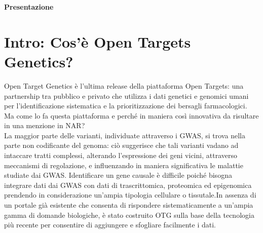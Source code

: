 \documentclass{article}
\begin{document}
\begin{center}
    \vspace*{1cm}
    \LARGE
    \textbf{Presentazione}

\end{center}
\Large
\section*{Intro: Cos'è Open Targets Genetics?}
Open Target Genetics è {l’ultima release della piattaforma Open Targets}: una partnership tra pubblico e privato
che utilizza i dati genetici e genomici umani per l’identificazione sistematica e la prioritizzazione dei bersagli
farmacologici.\\
Ma come lo fa questa piattaforma e perché in maniera così innovativa da risultare in una menzione in NAR?\\
La maggior parte delle varianti, individuate attraverso i GWAS, si trova nella parte non codificante del
genoma: ciò suggerisce che tali varianti vadano ad intaccare tratti complessi, alterando l’espressione
dei geni vicini, attraverso meccanismi di regolazione, e influenzando in maniera significativa le malattie
studiate dai GWAS. Identificare un gene causale è difficile poiché bisogna integrare dati dai GWAS
con dati di trascrittomica, proteomica ed epigenomica prendendo in considerazione un’ampia tipologia
cellulare o tissutale.In assenza di un portale già esistente che consenta di rispondere sistematicamente a
un’ampia gamma di domande biologiche, è stato costruito OTG sulla base della tecnologia più recente
per consentire di aggiungere e sfogliare facilmente i dati.
\end{document}
